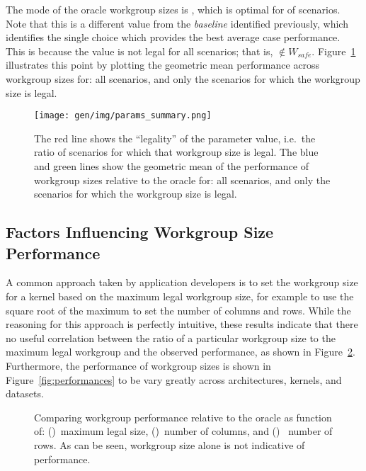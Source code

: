The mode of the oracle workgroup sizes is
, which is optimal for
 of scenarios. Note that this is
a different value from the \emph{baseline} identified previously,
which identifies the single choice which provides the best average
case performance. This is because the value is not legal for all
scenarios; that is, $ \not\in W_{safe}$.
Figure~\ref{fig:performance-legality} illustrates this point by
plotting the geometric mean performance across workgroup sizes for:
all scenarios, and only the scenarios for which the workgroup size is
legal.

\begin{figure}
\centering
\texttt{[image: gen/img/params\_summary.png]}
\caption{%
  The red line shows the ``legality'' of the parameter value, i.e.\
  the ratio of scenarios for which that workgroup size is legal.  The
  blue and green lines show the geometric mean of the performance of
  workgroup sizes relative to the oracle for: all scenarios, and only
  the scenarios for which the workgroup size is legal.%
}
\label{fig:performance-legality}
\end{figure}


\subsection{Factors Influencing Workgroup Size Performance}

A common approach taken by application developers is to set the
workgroup size for a kernel based on the maximum legal workgroup size,
for example to use the square root of the maximum to set the number of
columns and rows. While the reasoning for this approach is perfectly
intuitive, these results indicate that there no useful correlation
between the ratio of a particular workgroup size to the maximum legal
workgroup and the observed performance, as shown in
Figure~\ref{fig:performance-wgsizes}. Furthermore, the performance of
workgroup sizes is shown in Figure~\ref{fig:performances} to be vary
greatly across architectures, kernels, and datasets.


\begin{figure}

\caption{%
  Comparing workgroup performance relative to the oracle as function
  of: (\subref{fig:performance-max-wgsize})~maximum legal size,
  ()~number of columns, and
  ()~ number of rows. As can be seen,
  workgroup size alone is not indicative of performance.%
}
\label{fig:performance-wgsizes}
\end{figure}

